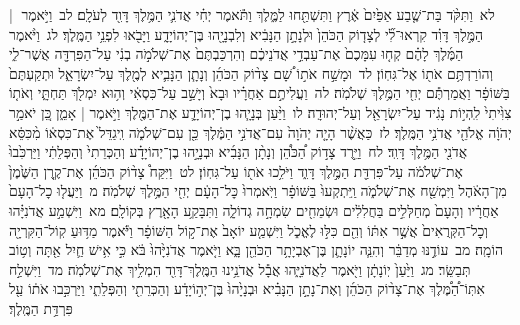 \documentclass[18pt]{article}
\newcommand{\kri}[1]{\Afootnote{#1}}	%
\begin{document}
 {\loc לא~}וַתִּקֹּ֨ד בַּת־שֶׁ֤בַע אַפַּ֙יִם֙ אֶ֔רֶץ וַתִּשְׁתַּ֖חוּ לַמֶּ֑לֶךְ וַתֹּ֕אמֶר יְחִ֗י אֲדֹנִ֛י הַמֶּ֥לֶךְ דָּוִ֖ד לְעֹלָֽם׃ \startlock
 {\loc לב~}וַיֹּ֣אמֶר  |  הַמֶּ֣לֶךְ דָּוִ֗ד קִרְאוּ־לִ֞י לְצָד֤וֹק הַכֹּהֵן֙ וּלְנָתָ֣ן הַנָּבִ֔יא וְלִבְנָיָ֖הוּ בֶּן־יְהוֹיָדָ֑ע וַיָּבֹ֖אוּ לִפְנֵ֥י הַמֶּֽלֶךְ׃ \startlock
 {\loc לג~}וַיֹּ֨אמֶר הַמֶּ֜לֶךְ לָהֶ֗ם קְח֤וּ עִמָּכֶם֙ אֶת־עַבְדֵ֣י אֲדֹנֵיכֶ֔ם וְהִרְכַּבְתֶּם֙ אֶת־שְׁלֹמֹ֣ה בְנִ֔י עַל־הַפִּרְדָּ֖ה אֲשֶׁר־לִ֑י וְהוֹרַדְתֶּ֥ם אֹת֖וֹ אֶל־גִּחֽוֹן׃ \startlock
 {\loc לד~}וּמָשַׁ֣ח אֹת֣וֹ שָׁ֠ם צָד֨וֹק הַכֹּהֵ֜ן וְנָתָ֧ן הַנָּבִ֛יא לְמֶ֖לֶךְ עַל־יִשְׂרָאֵ֑ל וּתְקַעְתֶּם֙ בַּשּׁוֹפָ֔ר וַאֲמַרְתֶּ֕ם יְחִ֖י הַמֶּ֥לֶךְ שְׁלֹמֹֽה׃ \startlock
 {\loc לה~}וַעֲלִיתֶ֣ם אַחֲרָ֗יו וּבָא֙ וְיָשַׁ֣ב עַל־כִּסְאִ֔י וְה֥וּא יִמְלֹ֖ךְ תַּחְתָּ֑י וְאֹת֤וֹ צִוִּ֙יתִי֙ לִֽהְי֣וֹת נָגִ֔יד עַל־יִשְׂרָאֵ֖ל וְעַל־יְהוּדָֽה׃ \startlock
 {\loc לו~}וַיַּ֨עַן בְּנָיָ֧הוּ בֶן־יְהוֹיָדָ֛ע אֶת־הַמֶּ֖לֶךְ וַיֹּ֣אמֶר  |  אָמֵ֑ן כֵּ֚ן יֹאמַ֣ר יְהֹוָ֔ה אֱלֹהֵ֖י אֲדֹנִ֥י הַמֶּֽלֶךְ׃ \startlock
 {\loc לז~}כַּאֲשֶׁ֨ר הָיָ֤ה יְהֹוָה֙ עִם־אֲדֹנִ֣י הַמֶּ֔לֶךְ כֵּ֖ן  \edtext{(יהי)}{\kri{קרי: יִהְיֶ֣ה}}  עִם־שְׁלֹמֹ֑ה וִֽיגַדֵּל֙ אֶת־כִּסְא֔וֹ מִ֨כִּסֵּ֔א אֲדֹנִ֖י הַמֶּ֥לֶךְ דָּוִֽד׃ \startlock
 {\loc לח~}וַיֵּ֣רֶד צָד֣וֹק הַ֠כֹּהֵ֠ן וְנָתָ֨ן הַנָּבִ֜יא וּבְנָיָ֣הוּ בֶן־יְהוֹיָדָ֗ע וְהַכְּרֵתִי֙ וְהַפְּלֵתִ֔י וַיַּרְכִּ֙בוּ֙ אֶת־שְׁלֹמֹ֔ה עַל־פִּרְדַּ֖ת הַמֶּ֣לֶךְ דָּוִ֑ד וַיֹּלִ֥כוּ אֹת֖וֹ עַל־גִּחֽוֹן׃ \startlock
 {\loc לט~}וַיִּקַּח֩ צָד֨וֹק הַכֹּהֵ֜ן אֶת־קֶ֤רֶן הַשֶּׁ֙מֶן֙ מִן־הָאֹ֔הֶל וַיִּמְשַׁ֖ח אֶת־שְׁלֹמֹ֑ה וַֽיִּתְקְעוּ֙ בַּשּׁוֹפָ֔ר וַיֹּֽאמְרוּ֙ כׇּל־הָעָ֔ם יְחִ֖י הַמֶּ֥לֶךְ שְׁלֹמֹֽה׃ \startlock
 {\loc מ~}וַיַּעֲל֤וּ כׇל־הָעָם֙ אַחֲרָ֔יו וְהָעָם֙ מְחַלְּלִ֣ים בַּחֲלִלִ֔ים וּשְׂמֵחִ֖ים שִׂמְחָ֣ה גְדוֹלָ֑ה וַתִּבָּקַ֥ע הָאָ֖רֶץ בְּקוֹלָֽם׃ \startlock
 {\loc מא~}וַיִּשְׁמַ֣ע אֲדֹנִיָּ֗הוּ וְכׇל־הַקְּרֻאִים֙ אֲשֶׁ֣ר אִתּ֔וֹ וְהֵ֖ם כִּלּ֣וּ לֶאֱכֹ֑ל וַיִּשְׁמַ֤ע יוֹאָב֙ אֶת־ק֣וֹל הַשּׁוֹפָ֔ר וַיֹּ֕אמֶר מַדּ֥וּעַ קֽוֹל־הַקִּרְיָ֖ה הוֹמָֽה׃ \startlock
 {\loc מב~}עוֹדֶ֣נּוּ מְדַבֵּ֔ר וְהִנֵּ֧ה יוֹנָתָ֛ן בֶּן־אֶבְיָתָ֥ר הַכֹּהֵ֖ן בָּ֑א וַיֹּ֤אמֶר אֲדֹנִיָּ֙הוּ֙ בֹּ֔א כִּ֣י אִ֥ישׁ חַ֛יִל אַ֖תָּה וְט֥וֹב תְּבַשֵּֽׂר׃ \startlock
 {\loc מג~}וַיַּ֙עַן֙ יֽוֹנָתָ֔ן וַיֹּ֖אמֶר לַאֲדֹנִיָּ֑הוּ אֲבָ֕ל אֲדֹנֵ֥ינוּ הַמֶּֽלֶךְ־דָּוִ֖ד הִמְלִ֥יךְ אֶת־שְׁלֹמֹֽה׃ \startlock
 {\loc מד~}וַיִּשְׁלַ֣ח אִתּֽוֹ־הַ֠מֶּ֠לֶךְ אֶת־צָד֨וֹק הַכֹּהֵ֜ן וְאֶת־נָתָ֣ן הַנָּבִ֗יא וּבְנָיָ֙הוּ֙ בֶּן־יְה֣וֹיָדָ֔ע וְהַכְּרֵתִ֖י וְהַפְּלֵתִ֑י וַיַּרְכִּ֣בוּ אֹת֔וֹ עַ֖ל פִּרְדַּ֥ת הַמֶּֽלֶךְ׃ \startlock
\end{document}
